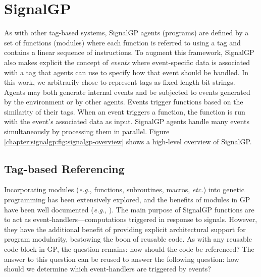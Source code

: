 \section{SignalGP}

As with other tag-based systems, 
SignalGP agents (programs) are defined by a set of functions (modules) where each function is referred to using a tag and contains a linear sequence of instructions.
To augment this framework, SignalGP also makes explicit the concept of \textit{events} where event-specific data is associated with a tag that agents can use to specify how that event should be handled.  
In this work, we arbitrarily chose to represent tags as fixed-length bit strings. 
Agents may both generate internal events and be subjected to events generated by the environment or by other agents. 
Events trigger functions based on the similarity of their tags. When an event triggers a function, the function is run with the event's associated data as input. 
SignalGP agents handle many events simultaneously by processing them in parallel. 
Figure \ref{chapter:signalgp:fig:signalgp-overview} shows a high-level overview of SignalGP. 



\subsection{Tag-based Referencing}
\label{chapter:signalgp:sec:signalgp:tag-based-referencing}

Incorporating modules (\textit{e.g.}, functions, subroutines, macros, \textit{etc.}) into genetic programming has been extensively explored, and the benefits of modules in GP have been well documented
(\textit{e.g.}, \cite{koza_genetic_1992,koza_genetic_1994,angeline_evolutionary_1992,keijzer_undirected_2005,walker_automatic_2008,roberts_evolving_2001,spector_simultaneous_1996}). 
The main purpose of SignalGP functions are to act as event-handlers---computations triggered in response to signals. However, they have the additional benefit of providing explicit architectural support for program modularity, bestowing the boon of reusable code. 
As with any reusable code block in GP, the question remains: how should the code be referenced? 
The answer to this question can be reused to answer the following question: how should we determine which event-handlers are triggered by events? 

